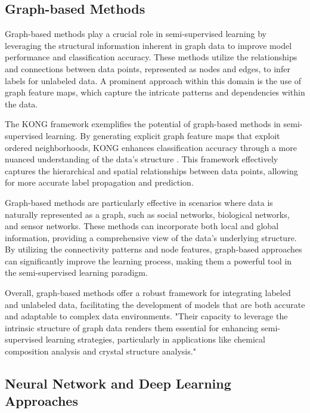 \subsection{Graph-based Methods} \label{subsec:Graph-based Methods}

Graph-based methods play a crucial role in semi-supervised learning by leveraging the structural information inherent in graph data to improve model performance and classification accuracy. These methods utilize the relationships and connections between data points, represented as nodes and edges, to infer labels for unlabeled data. A prominent approach within this domain is the use of graph feature maps, which capture the intricate patterns and dependencies within the data.



The KONG framework exemplifies the potential of graph-based methods in semi-supervised learning. By generating explicit graph feature maps that exploit ordered neighborhoods, KONG enhances classification accuracy through a more nuanced understanding of the data's structure \cite{draief2018kongkernelsorderedneighborhoodgraphs}. This framework effectively captures the hierarchical and spatial relationships between data points, allowing for more accurate label propagation and prediction.



Graph-based methods are particularly effective in scenarios where data is naturally represented as a graph, such as social networks, biological networks, and sensor networks. These methods can incorporate both local and global information, providing a comprehensive view of the data's underlying structure. By utilizing the connectivity patterns and node features, graph-based approaches can significantly improve the learning process, making them a powerful tool in the semi-supervised learning paradigm.



Overall, graph-based methods offer a robust framework for integrating labeled and unlabeled data, facilitating the development of models that are both accurate and adaptable to complex data environments. "Their capacity to leverage the intrinsic structure of graph data renders them essential for enhancing semi-supervised learning strategies, particularly in applications like chemical composition analysis and crystal structure analysis." \cite{shinji2024learningattributedgraphletspredictive}



\subsection{Neural Network and Deep Learning Approaches} \label{subsec:Neural Network and Deep Learning Approaches}

